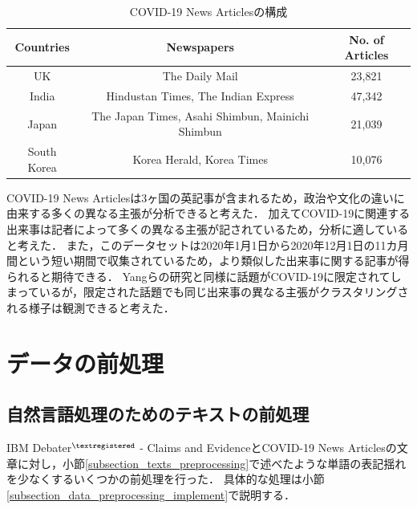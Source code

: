 \documentclass[12pt,a4j,dvipdfmx]{jreport}
\begin{document}
\begin{table}[H]
  \caption{COVID-19 News Articlesの構成}
  \centering
  \vspace{4mm}
  \begin{tabular}{ccc}
    \hline
    Countries & Newspapers & No. of Articles \\
    \hline
    UK & The Daily Mail & 23,821 \\
    India & Hindustan Times, The Indian Express & 47,342 \\
    Japan & The Japan Times, Asahi Shimbun, Mainichi Shimbun & 21,039 \\
    South Korea & Korea Herald, Korea Times & 10,076 \\
    \hline
    \end{tabular}
  \label{covid_19_news_articles_composition}
\end{table}

\newpage

COVID-19 News Articlesは3ヶ国の英記事が含まれるため，政治や文化の違いに由来する多くの異なる主張が分析できると考えた．
加えてCOVID-19に関連する出来事は記者によって多くの異なる主張が記されているため，分析に適していると考えた．
また，このデータセットは2020年1月1日から2020年12月1日の11カ月間という短い期間で収集されているため，より類似した出来事に関する記事が得られると期待できる．
Yangらの研究と同様に話題がCOVID-19に限定されてしまっているが，限定された話題でも同じ出来事の異なる主張がクラスタリングされる様子は観測できると考えた．

\section{データの前処理}
\label{section_preprocessing_data}

\subsection{自然言語処理のためのテキストの前処理}
IBM Debater$^{\textregistered}$ - Claims and EvidenceとCOVID-19 News Articlesの文章に対し，小節\ref{subsection_texts_preprocessing}で述べたような単語の表記揺れを少なくするいくつかの前処理を行った．
具体的な処理は小節\ref{subsection_data_preprocessing_implement}で説明する．

\end{document}
